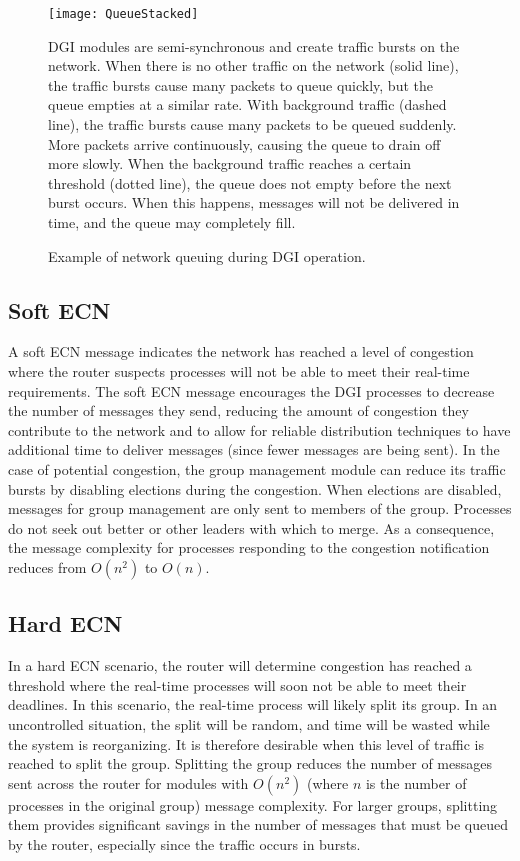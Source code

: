 \begin{figure}
\centering
\texttt{[image: QueueStacked]}
\caption{
Example of network queuing during \ac{DGI} operation.
}
\ac{DGI} modules are semi-synchronous and create traffic bursts on the network.
When there is no other traffic on the network (solid line), the traffic bursts cause many packets to queue quickly, but the queue empties at a similar rate.
With background traffic (dashed line), the traffic bursts cause many packets to be queued suddenly. More packets arrive continuously, causing the queue to drain off more slowly.
When the background traffic reaches a certain threshold (dotted line), the queue does not empty before the next burst occurs. When this happens, messages will not be delivered in time, and the queue may completely fill.
\label{fig:queue-types}
\end{figure}

\subsection{Soft \ac{ECN}}

A soft \ac{ECN} message indicates the network has reached a level of congestion where the router suspects processes will not be able to meet their real-time requirements.
The soft \ac{ECN} message encourages the \ac{DGI} processes to decrease the number of messages they send, reducing the amount of congestion they contribute to the network and to allow for reliable distribution techniques to have additional time to deliver messages (since fewer messages are being sent).
In the case of potential congestion, the group management module can reduce its traffic bursts by disabling elections during the congestion.
When elections are disabled, messages for group management are only sent to members of the group.
Processes do not seek out better or other leaders with which to merge.
As a consequence, the message complexity for processes responding to the congestion notification reduces from $O(n^2)$ to $O(n)$.

\subsection{Hard \ac{ECN}}

In a hard \ac{ECN} scenario, the router will determine congestion has reached a threshold where the real-time processes will soon not be able to meet their deadlines.
In this scenario, the real-time process will likely split its group.
In an uncontrolled situation, the split will be random, and time will be wasted while the system is reorganizing.
It is therefore desirable when this level of traffic is reached to split the group.
Splitting the group reduces the number of messages sent across the router for modules with $O(n^2)$ (where $n$ is the number of processes in the original group) message complexity.
For larger groups, splitting them provides significant savings in the number of messages that must be queued by the router, especially since the traffic occurs in bursts.

